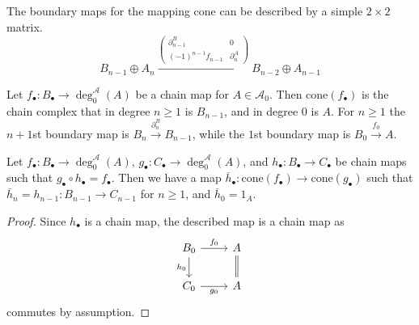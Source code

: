The boundary maps for the mapping cone can be described by a simple $2 \times 2$ matrix.
\begin{equation*}
	{B_{n-1}\oplus A_n} \xrightarrow{\begin{pmatrix} \partial^B_{n-1} & 0 \\ (-1)^{n-1}f_{n-1} & \partial_n^A \end{pmatrix}} {B_{n-2}\oplus A_{n-1}}
\end{equation*}

\begin{rmk}
    Let $f_\bullet:B_\bullet \to \deg_0^\mathcal{A}(A)$ be a chain map for $A \in \mathcal{A}_0$. Then $\text{cone}(f_\bullet)$ is the chain complex that in degree $n \geq 1$ is $B_{n-1}$, and in degree $0$ is $A$. For $n \geq 1$ the $n+1$st boundary map is $B_n\xrightarrow{\partial_n^B}B_{n-1}$, while the $1$st boundary map is $B_0\xrightarrow{f_0}A$. 
\end{rmk}

\begin{prop}[label=prop:mapBetweenCones]
    Let $f_\bullet:B_\bullet\to \deg_0^\mathcal{A}(A)$, $g_\bullet:C_\bullet\to \deg_0^\mathcal{A}(A)$, and $h_\bullet:B_\bullet\to C_\bullet$ be chain maps such that $g_\bullet\circ h_\bullet = f_\bullet$. Then we have a map $\overline{h}_\bullet:\text{cone}(f_\bullet)\to \text{cone}(g_\bullet)$ such that $\overline{h}_n = h_{n-1}:B_{n-1}\to C_{n-1}$ for $n \geq 1$, and $\overline{h}_0 = 1_A$.
\end{prop}
\begin{proof}
    Since $h_\bullet$ is a chain map, the described map is a chain map as 
    \[\begin{tikzcd}
        {B_0} & A \\
        {C_0} & A
        \arrow["{f_0}", from=1-1, to=1-2]
        \arrow["{h_0}"', from=1-1, to=2-1]
        \arrow["{g_0}"', from=2-1, to=2-2]
        \arrow[Rightarrow, no head, from=1-2, to=2-2]
    \end{tikzcd}\]
    commutes by assumption.
\end{proof}

